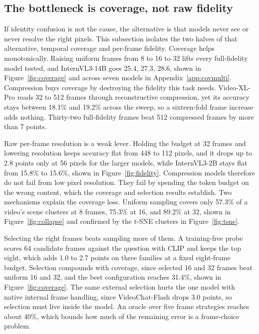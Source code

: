 \documentclass{article}
\begin{document}
\subsection{The bottleneck is coverage, not raw fidelity}
\label{sec:coverage}
If identity confusion is not the cause, the alternative is that models never see or never resolve the right pixels. This subsection isolates the two halves of that alternative, temporal coverage and per-frame fidelity. Coverage helps monotonically. Raising uniform frames from 8 to 16 to 32 lifts every full-fidelity model tested, and InternVL3-14B goes 25.4, 27.3, 28.6, shown in Figure~\ref{fig:coverage} and across seven models in Appendix~\ref{app:covmulti}. Compression buys coverage by destroying the fidelity this task needs. Video-XL-Pro reads 32 to 512 frames through reconstructive compression, yet its accuracy stays between 18.1\% and 19.2\% across the sweep, so a sixteen-fold frame increase adds nothing. Thirty-two full-fidelity frames beat 512 compressed frames by more than 7 points.

Raw per-frame resolution is a weak lever. Holding the budget at 32 frames and lowering resolution keeps accuracy flat from 448 to 112 pixels, and it drops up to 2.8 points only at 56 pixels for the larger models, while InternVL3-2B stays flat from 15.8\% to 15.6\%, shown in Figure~\ref{fig:fidelity}. Compression models therefore do not fail from low pixel resolution. They fail by spending the token budget on the wrong content, which the coverage and selection results establish. Two mechanisms explain the coverage loss. Uniform sampling covers only 57.3\% of a video's scene clusters at 8 frames, 75.3\% at 16, and 89.2\% at 32, shown in Figure~\ref{fig:collapse} and confirmed by the t-SNE clusters in Figure~\ref{fig:tsne}.

Selecting the right frames beats sampling more of them. A training-free probe scores 64 candidate frames against the question with CLIP and keeps the top eight, which adds 1.0 to 2.7 points on three families at a fixed eight-frame budget. Selection compounds with coverage, since selected 16 and 32 frames beat uniform 16 and 32, and the best configuration reaches 31.4\%, shown in Figure~\ref{fig:coverage}. The same external selection hurts the one model with native internal frame handling, since VideoChat-Flash drops 3.0 points, so selection must live inside the model. An oracle over five frame strategies reaches about 40\%, which bounds how much of the remaining error is a frame-choice problem.
\end{document}
